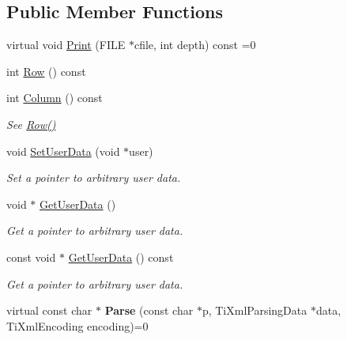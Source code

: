 \subsection*{Public Member Functions}
\begin{DoxyCompactItemize}
\item 
virtual void \hyperlink{class_ti_xml_base_a0de56b3f2ef14c65091a3b916437b512}{Print} (F\-I\-L\-E $\ast$cfile, int depth) const =0
\item 
int \hyperlink{class_ti_xml_base_a024bceb070188df92c2a8d8852dd0853}{Row} () const 
\item 
\hypertarget{class_ti_xml_base_ab54bfb9b70fe6dd276e7b279cab7f003}{int \hyperlink{class_ti_xml_base_ab54bfb9b70fe6dd276e7b279cab7f003}{Column} () const }\label{class_ti_xml_base_ab54bfb9b70fe6dd276e7b279cab7f003}

\begin{DoxyCompactList}\small\item\em See \hyperlink{class_ti_xml_base_a024bceb070188df92c2a8d8852dd0853}{Row()} \end{DoxyCompactList}\item 
\hypertarget{class_ti_xml_base_ac6b3e0f790930d4970ec30764e937b5d}{void \hyperlink{class_ti_xml_base_ac6b3e0f790930d4970ec30764e937b5d}{Set\-User\-Data} (void $\ast$user)}\label{class_ti_xml_base_ac6b3e0f790930d4970ec30764e937b5d}

\begin{DoxyCompactList}\small\item\em Set a pointer to arbitrary user data. \end{DoxyCompactList}\item 
\hypertarget{class_ti_xml_base_a6559a530ca6763fc301a14d77ed28c17}{void $\ast$ \hyperlink{class_ti_xml_base_a6559a530ca6763fc301a14d77ed28c17}{Get\-User\-Data} ()}\label{class_ti_xml_base_a6559a530ca6763fc301a14d77ed28c17}

\begin{DoxyCompactList}\small\item\em Get a pointer to arbitrary user data. \end{DoxyCompactList}\item 
\hypertarget{class_ti_xml_base_ad0120210e4680ef2088601753ce0ede4}{const void $\ast$ \hyperlink{class_ti_xml_base_ad0120210e4680ef2088601753ce0ede4}{Get\-User\-Data} () const }\label{class_ti_xml_base_ad0120210e4680ef2088601753ce0ede4}

\begin{DoxyCompactList}\small\item\em Get a pointer to arbitrary user data. \end{DoxyCompactList}\item 
\hypertarget{class_ti_xml_base_a00e4edb0219d00a1379c856e5a1d2025}{virtual const char $\ast$ {\bfseries Parse} (const char $\ast$p, Ti\-Xml\-Parsing\-Data $\ast$data, Ti\-Xml\-Encoding encoding)=0}\label{class_ti_xml_base_a00e4edb0219d00a1379c856e5a1d2025}

\end{DoxyCompactItemize}
